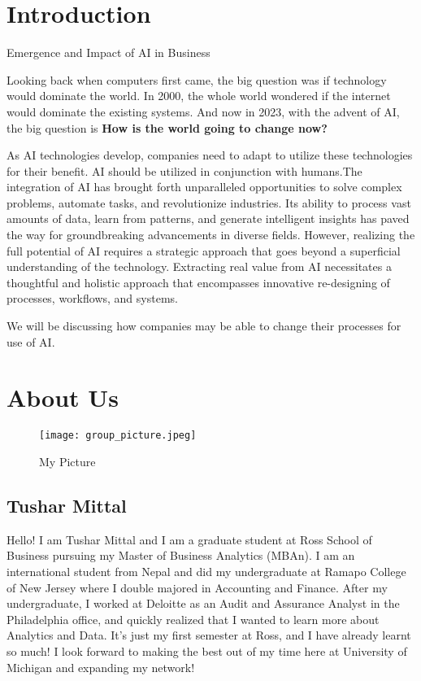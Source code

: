 \documentclass[
]{article}
\begin{document}
\hypertarget{introduction}{%
\section*{Introduction}\label{introduction}}

Emergence and Impact of AI in Business

Looking back when computers first came, the big question was if technology would dominate the world. In 2000, the whole world wondered if the internet would dominate the existing systems. And now in 2023, with the advent of AI, the big question is \textbf{How is the world going to change now?}

As AI technologies develop, companies need to adapt to utilize these technologies for their benefit. AI should be utilized in conjunction with humans.The integration of AI has brought forth unparalleled opportunities to solve complex problems, automate tasks, and revolutionize industries. Its ability to process vast amounts of data, learn from patterns, and generate intelligent insights has paved the way for groundbreaking advancements in diverse fields. However, realizing the full potential of AI requires a strategic approach that goes beyond a superficial understanding of the technology. Extracting real value from AI necessitates a thoughtful and holistic approach that encompasses innovative re-designing of processes, workflows, and systems.

We will be discussing how companies may be able to change their processes for use of AI.

\hypertarget{about-us}{%
\section*{About Us}\label{about-us}}

\begin{figure}
\centering
\texttt{[image: group\_picture.jpeg]}
\caption{My Picture}
\end{figure}

\hypertarget{tushar-mittal}{%
\subsection{Tushar Mittal}\label{tushar-mittal}}

Hello!
I am Tushar Mittal and I am a graduate student at Ross School of Business pursuing my Master of Business Analytics (MBAn). I am an international student from Nepal and did my undergraduate at Ramapo College of New Jersey where I double majored in Accounting and Finance. After my undergraduate, I worked at Deloitte as an Audit and Assurance Analyst in the Philadelphia office, and quickly realized that I wanted to learn more about Analytics and Data. It's just my first semester at Ross, and I have already learnt so much! I look forward to making the best out of my time here at University of Michigan and expanding my network!
\end{document}
